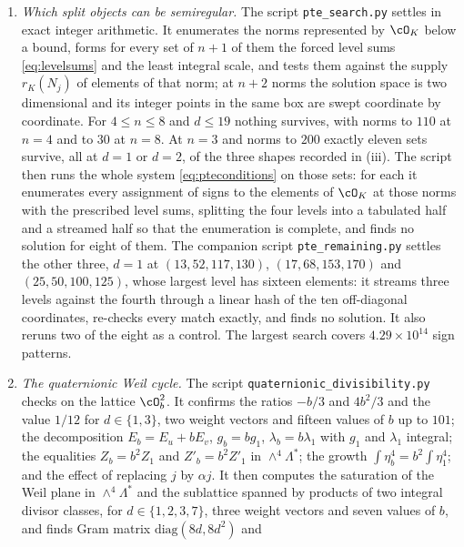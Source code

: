 \begin{enumerate}[label=\textup{(\Roman*)},leftmargin=*]
\item \emph{Which split objects can be semiregular.} The script
  \texttt{pte\_\allowbreak search.py} settles  in exact integer
  arithmetic. It enumerates the norms represented by $\cO_{K}$ below a bound,
  forms for every set of $n+1$ of them the forced level sums
  \eqref{eq:levelsums} and the least integral scale, and tests them against
  the supply $r_{K}(N_{j})$ of elements of that norm; at $n+2$ norms the
  solution space is two dimensional and its integer points in the same box are
  swept coordinate by coordinate. For $4\le n\le8$ and $d\le19$ nothing
  survives, with norms to $110$ at $n=4$ and to $30$ at $n=8$. At $n=3$ and
  norms to $200$ exactly eleven sets survive, all at $d=1$ or $d=2$, of the
  three shapes recorded in (iii). The script then runs the
  whole system \eqref{eq:pteconditions} on those sets: for each it enumerates
  every assignment of signs to the elements of $\cO_{K}$ at those norms with
  the prescribed level sums, splitting the four levels into a tabulated half
  and a streamed half so that the enumeration is complete, and finds no
  solution for eight of them. The companion script
  \texttt{pte\_\allowbreak remaining.py} settles the other three, $d=1$ at
  $(13,52,117,130)$, $(17,68,153,170)$ and $(25,50,100,125)$, whose largest
  level has sixteen elements: it streams three levels against the fourth
  through a linear hash of the ten off-diagonal coordinates, re-checks every
  match exactly, and finds no solution. It also reruns two of the eight as a
  control. The largest search covers $4.29\times10^{14}$ sign patterns.
\item \emph{The quaternionic Weil cycle.} The script
  \texttt{quaternionic\_\allowbreak divisibility.py} checks
   on the lattice $\cO_{b}^{2}$. It confirms the
  ratios $-b/3$ and $4b^{2}/3$ and the value $1/12$ for $d\in\{1,3\}$, two
  weight vectors and fifteen values of $b$ up to $101$; the decomposition
  $E_{b}=E_{u}+bE_{v}$, $g_{b}=bg_{1}$, $\lambda_{b}=b\lambda_{1}$ with $g_{1}$
  and $\lambda_{1}$ integral; the equalities $Z_{b}=b^{2}Z_{1}$ and
  $Z'_{b}=b^{2}Z'_{1}$ in $\wedge^{4}\Lambda^{*}$; the growth
  $\int\eta_{b}^{4}=b^{2}\int\eta_{1}^{4}$; and the effect of replacing $j$ by
  $\alpha j$. It then computes the saturation of the Weil plane in
  $\wedge^{4}\Lambda^{*}$ and the sublattice spanned by products of two
  integral divisor classes, for $d\in\{1,2,3,7\}$, three weight vectors and
  seven values of $b$, and finds Gram matrix $\mathrm{diag}(8d,8d^{2})$ and

\end{enumerate}
